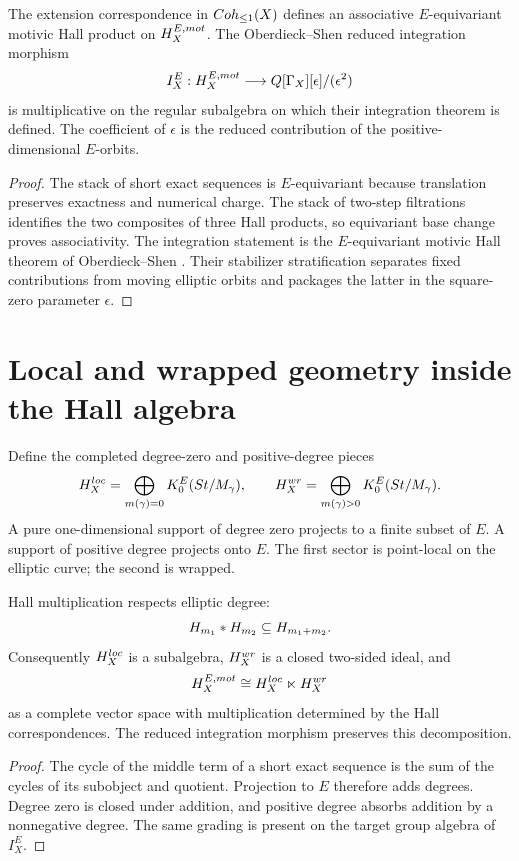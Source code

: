 \begin{theorem}
The extension correspondence in $Coh_{\leq1}(X)$ defines an associative $E$-equivariant motivic Hall product on $H_X^{E,mot}$.  The Oberdieck--Shen reduced integration morphism
\[
 I_X^E:H_X^{E,mot}
 \longrightarrow
 Q[\Gamma_X][\epsilon]/(\epsilon^2)
\]
is multiplicative on the regular subalgebra on which their integration theorem is defined.  The coefficient of $\epsilon$ is the reduced contribution of the positive-dimensional $E$-orbits.
\end{theorem}
\begin{proof}
The stack of short exact sequences is $E$-equivariant because translation preserves exactness and numerical charge.  The stack of two-step filtrations identifies the two composites of three Hall products, so equivariant base change proves associativity.  The integration statement is the $E$-equivariant motivic Hall theorem of Oberdieck--Shen \cite{OberdieckShen}.  Their stabilizer stratification separates fixed contributions from moving elliptic orbits and packages the latter in the square-zero parameter $\epsilon$.
\end{proof}

\chapter{Local and wrapped geometry inside the Hall algebra}
Define the completed degree-zero and positive-degree pieces
\[
 H_X^{loc}
 =\bigoplus_{m(\gamma)=0}
 K_0^E(St/M_\gamma),
 \qquad
 H_X^{wr}
 =\bigoplus_{m(\gamma)>0}
 K_0^E(St/M_\gamma).
\]
A pure one-dimensional support of degree zero projects to a finite subset of $E$.  A support of positive degree projects onto $E$.  The first sector is point-local on the elliptic curve; the second is wrapped.

\begin{theorem}
Hall multiplication respects elliptic degree:
\[
 H_{m_1}*H_{m_2}\subseteq H_{m_1+m_2}.
\]
Consequently $H_X^{loc}$ is a subalgebra, $H_X^{wr}$ is a closed two-sided ideal, and
\[
 H_X^{E,mot}
 \cong
 H_X^{loc}\ltimes H_X^{wr}
\]
as a complete vector space with multiplication determined by the Hall correspondences.  The reduced integration morphism preserves this decomposition.
\end{theorem}
\begin{proof}
The cycle of the middle term of a short exact sequence is the sum of the cycles of its subobject and quotient.  Projection to $E$ therefore adds degrees.  Degree zero is closed under addition, and positive degree absorbs addition by a nonnegative degree.  The same grading is present on the target group algebra of $I_X^E$.
\end{proof}

